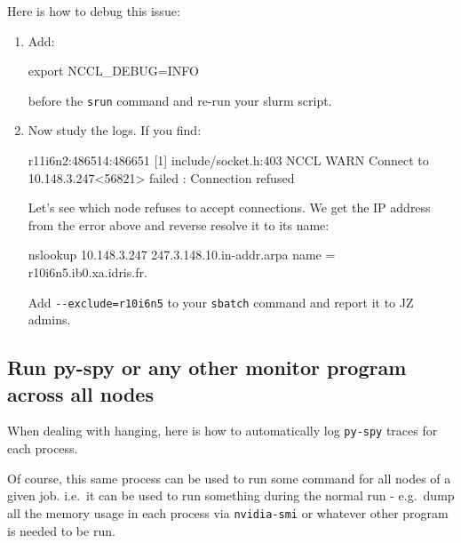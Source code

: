 \documentclass[
]{report}
\newenvironment{Shaded}{\begin{snugshade}}{\end{snugshade}}
\newcommand{\BuiltInTok}[1]{\textcolor[rgb]{0.00,0.23,0.31}{#1}}
\newcommand{\ExtensionTok}[1]{\textcolor[rgb]{0.00,0.23,0.31}{#1}}
\newcommand{\NormalTok}[1]{\textcolor[rgb]{0.00,0.23,0.31}{#1}}
\newcommand{\OperatorTok}[1]{\textcolor[rgb]{0.37,0.37,0.37}{#1}}
\newcommand{\PreprocessorTok}[1]{\textcolor[rgb]{0.68,0.00,0.00}{#1}}
\newcommand{\SpecialStringTok}[1]{\textcolor[rgb]{0.13,0.47,0.30}{#1}}
\newcommand{\VariableTok}[1]{\textcolor[rgb]{0.07,0.07,0.07}{#1}}
\begin{document}
Here is how to debug this issue:

\begin{enumerate}
\def\labelenumi{\arabic{enumi}.}
\item
  Add:

\begin{Shaded}
\begin{Highlighting}[]
\BuiltInTok{export} \VariableTok{NCCL\_DEBUG}\OperatorTok{=}\NormalTok{INFO}
\end{Highlighting}
\end{Shaded}

  before the \texttt{srun} command and re-run your slurm script.
\item
  Now study the logs. If you find:

\begin{Shaded}
\begin{Highlighting}[]
\ExtensionTok{r11i6n2:486514:486651} \PreprocessorTok{[}\SpecialStringTok{1}\PreprocessorTok{]}\NormalTok{ include/socket.h:403 NCCL WARN Connect to 10.148.3.247}\OperatorTok{\textless{}}\NormalTok{56821}\OperatorTok{\textgreater{}}\NormalTok{ failed : Connection refused}
\end{Highlighting}
\end{Shaded}

  Let's see which node refuses to accept connections. We get the IP
  address from the error above and reverse resolve it to its name:

\begin{Shaded}
\begin{Highlighting}[]
\ExtensionTok{nslookup}\NormalTok{ 10.148.3.247}
\ExtensionTok{247.3.148.10.in{-}addr.arpa}\NormalTok{       name = r10i6n5.ib0.xa.idris.fr.}
\end{Highlighting}
\end{Shaded}

  Add \texttt{-\/-exclude=r10i6n5} to your \texttt{sbatch} command and
  report it to JZ admins.
\end{enumerate}

\subsection{Run py-spy or any other monitor program across all
nodes}\label{run-py-spy-or-any-other-monitor-program-across-all-nodes}

When dealing with hanging, here is how to automatically log
\texttt{py-spy} traces for each process.

Of course, this same process can be used to run some command for all
nodes of a given job. i.e.~it can be used to run something during the
normal run - e.g.~dump all the memory usage in each process via
\texttt{nvidia-smi} or whatever other program is needed to be run.
\end{document}
